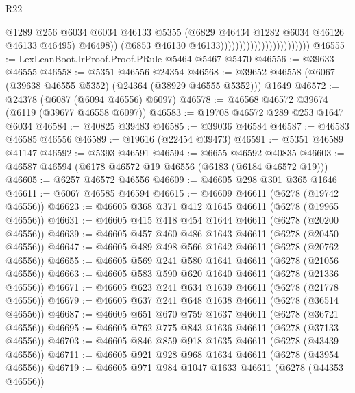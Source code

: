 \begin{lexlean}{R22}
\begin{coremodule}
                                                      @1289
                                                      @256
                                                      @6034
                                                      @6034
                                                      @46133
                                                      @5355
                                                      (@6829
                                                        @46434
                                                        @1282
                                                        @6034
                                                        @46126
                                                        @46133
                                                        @46495)
                                                      @46498))
                                                  (@6853 @46130 @46133))))))))))))))))))))))))
@46555 := LexLeanBoot.IrProof.Proof.PRule @5464 @5467 @5470
@46556 := @39633 @46555
@46558 := @5351 @46556 @24354
@46568 := @39652 @46558 (@6067 (@39638 @46555 @5352) (@24364 (@38929 @46555 @5352))) @1649
@46572 := @24378 (@6087 (@6094 @46556) @6097)
@46578 := @46568 @46572 @39674 (@6119 (@39677 @46558 @6097))
@46583 := @19708 @46572 @289 @253 @1647 @6034
@46584 := @40825 @39483
@46585 := @39036 @46584
@46587 := @46583 @46585 @46556
@46589 := @19616 (@22454 @39473)
@46591 := @5351 @46589 @41147
@46592 := @5393 @46591
@46594 := @6655 @46592 @40835
@46603 := @46587 @46594 (@6178 @46572 @19 @46556 (@6183 (@6184 @46572 @19)))
@46605 := @6257 @46572 @46556
@46609 := @46605 @298 @301 @365 @1646
@46611 := @6067 @46585 @46594
@46615 := @46609 @46611 (@6278 (@19742 @46556))
@46623 := @46605 @368 @371 @412 @1645 @46611 (@6278 (@19965 @46556))
@46631 := @46605 @415 @418 @454 @1644 @46611 (@6278 (@20200 @46556))
@46639 := @46605 @457 @460 @486 @1643 @46611 (@6278 (@20450 @46556))
@46647 := @46605 @489 @498 @566 @1642 @46611 (@6278 (@20762 @46556))
@46655 := @46605 @569 @241 @580 @1641 @46611 (@6278 (@21056 @46556))
@46663 := @46605 @583 @590 @620 @1640 @46611 (@6278 (@21336 @46556))
@46671 := @46605 @623 @241 @634 @1639 @46611 (@6278 (@21778 @46556))
@46679 := @46605 @637 @241 @648 @1638 @46611 (@6278 (@36514 @46556))
@46687 := @46605 @651 @670 @759 @1637 @46611 (@6278 (@36721 @46556))
@46695 := @46605 @762 @775 @843 @1636 @46611 (@6278 (@37133 @46556))
@46703 := @46605 @846 @859 @918 @1635 @46611 (@6278 (@43439 @46556))
@46711 := @46605 @921 @928 @968 @1634 @46611 (@6278 (@43954 @46556))
@46719 := @46605 @971 @984 @1047 @1633 @46611 (@6278 (@44353 @46556))

\end{coremodule}
\end{lexlean}
